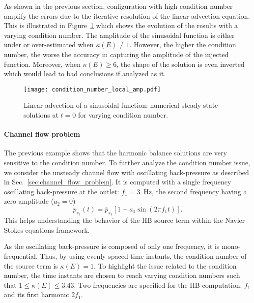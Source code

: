 As shown in the previous section, configuration with
high condition number amplify the errors due to
the iterative resolution of the linear advection equation.
This is illustrated in Figure~\ref{fig:condition_number_local_amp} which 
shows the evolution of the results with a varying condition number.
The amplitude of the
sinusoidal function is either under or over-estimated when
$\kappa (E) \neq 1$. However, 
the higher the condition number, the worse the accuracy in capturing
the amplitude of the injected function. Moreover, when $\kappa(E) \geq 6$,
the shape of the solution is even inverted which would lead to
bad conclusions if analyzed as it.
\begin{figure}[htp]
  \centering
  \texttt{[image: condition\_number\_local\_amp.pdf]}
  \caption{Linear advection of a sinusoidal function: numerical steady-state 
  solutions at $t=0$ for varying condition number.}
  \label{fig:condition_number_local_amp}
\end{figure}

\paragraph{Channel flow problem}
The previous example shows that the harmonic
balance solutions are very sensitive to the condition number.
To further analyze the condition number issue,
we consider the unsteady channel flow with 
oscillating back-pressure as described in 
Sec.~\ref{sec:channel_flow_problem}.
It is computed with a single
frequency oscillating back-pressure 
at the outlet: $f_1 = 3$~Hz, the second
frequency having a zero amplitude ($a_2= 0$)
\begin{equation}
   p_{s_1} (t) = \overline{p}_{s_1} \left[ 1 + a_1 \sin \left(2 \pi f_1 t\right) \right].
\end{equation}
This helps understanding the behavior of the HB source term
within the Navier--Stokes equations framework.

As the oscillating back-pressure is composed of only one frequency,
it is mono-frequential.
Thus, by using evenly-spaced time instants, the condition
number of the source term is $\kappa (E) = 1$. 
To highlight the issue related to the condition number,
the time instants are chosen to reach varying condition numbers
such that $1 \leq \kappa (E) \leq 3.43$.  
Two frequencies are
specified for the HB computation: $f_1$ and its first harmonic
$2f_1$. 


